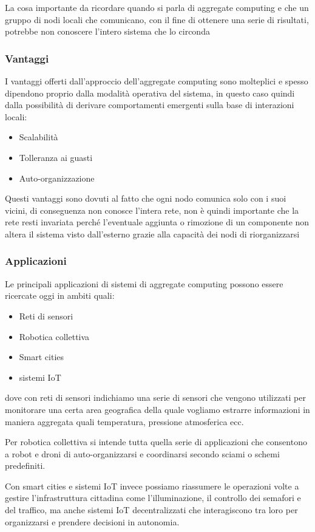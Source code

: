 \documentclass[12pt,a4paper,openright,twoside]{book}
\begin{document}
La cosa importante da ricordare quando si parla di aggregate computing e che un gruppo di nodi locali che comunicano, con il fine di ottenere una serie di risultati, potrebbe non conoscere l'intero sistema che lo circonda

\subsubsection{Vantaggi}
I vantaggi offerti dall'approccio dell'aggregate computing sono molteplici e spesso dipendono proprio dalla modalità operativa del sistema, in questo caso quindi dalla possibilità di derivare comportamenti emergenti sulla base di interazioni locali:
\begin{itemize}
	\item Scalabilità
	\item Tolleranza ai guasti
	\item Auto-organizzazione
\end{itemize}
Questi vantaggi sono dovuti al fatto che ogni nodo comunica solo con i suoi vicini, di conseguenza non conosce l'intera rete, non è quindi importante che la rete resti invariata perché l'eventuale aggiunta o rimozione di un componente non altera il sistema visto dall'esterno grazie alla capacità dei nodi di riorganizzarsi

\subsubsection{Applicazioni}
Le principali applicazioni di sistemi di aggregate computing possono essere ricercate oggi in ambiti quali:
\begin{itemize}
	\item Reti di sensori
	\item Robotica collettiva
	\item Smart cities
	\item sistemi IoT
\end{itemize}
dove con reti di sensori indichiamo una serie di sensori che vengono utilizzati per monitorare una certa area geografica della quale vogliamo estrarre informazioni in maniera aggregata quali temperatura, pressione atmosferica ecc.


Per robotica collettiva si intende tutta quella serie di applicazioni che consentono a robot e droni di auto-organizzarsi e coordinarsi secondo sciami o schemi predefiniti.


Con smart cities e sistemi IoT invece possiamo riassumere le operazioni volte a gestire l'infrastruttura cittadina come l'illuminazione, il controllo dei semafori e del traffico, ma anche sistemi IoT decentralizzati che interagiscono tra loro per organizzarsi e prendere decisioni in autonomia.
\end{document}
